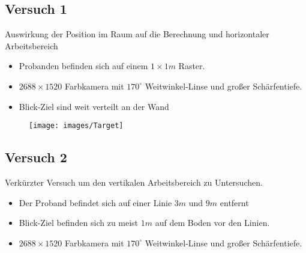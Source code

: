 \subsection{Versuch 1}
\begin{frame}
Auswirkung der Position im Raum auf die Berechnung und horizontaler Arbeitsbereich
\begin{itemize}
	\item<1-> Probanden befinden sich auf einem $1\times 1m$ Raster.
	\item<1-> $2688\times 1520$ Farbkamera mit $170^\circ$ Weitwinkel-Linse und großer Schärfentiefe.
	\item<1-> Blick-Ziel sind weit verteilt an der Wand
\end{itemize}
\begin{figure}
	\centering
	\texttt{[image: images/Target]}
\end{figure}
\end{frame}
\begin{frame}
\begin{center}
	
	
\end{center}
\end{frame}
\begin{frame}
\begin{center}

\end{center}
\end{frame}
\subsection{Versuch 2}
\begin{frame}
Verkürzter Versuch um den vertikalen Arbeitsbereich zu Untersuchen.
\begin{itemize}
	\item<1-> Der Proband befindet sich auf einer Linie $3m$ und $9m$ entfernt
	\item<1-> Blick-Ziel befinden sich zu meist $1m$ auf dem Boden vor den Linien.
	\item<1-> $2688\times 1520$ Farbkamera mit $170^\circ$ Weitwinkel-Linse und großer Schärfentiefe.
\end{itemize}
\end{frame}
\begin{frame}
\begin{center}
	
	
\end{center}
\end{frame}
